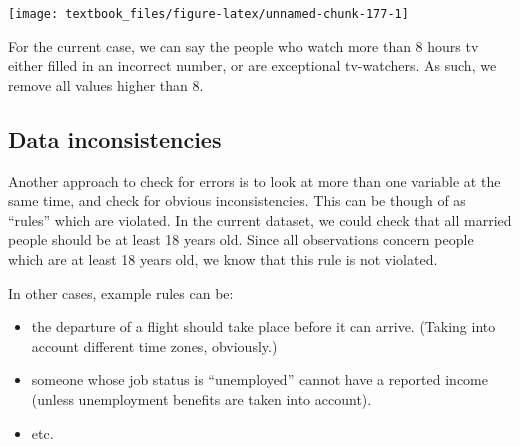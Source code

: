 \documentclass[]{tufte-book}
\newenvironment{Shaded}{}{}
\newcommand{\DataTypeTok}[1]{\textcolor[rgb]{0.56,0.13,0.00}{#1}}
\newcommand{\DecValTok}[1]{\textcolor[rgb]{0.25,0.63,0.44}{#1}}
\newcommand{\KeywordTok}[1]{\textcolor[rgb]{0.00,0.44,0.13}{\textbf{#1}}}
\newcommand{\NormalTok}[1]{#1}
\newcommand{\OperatorTok}[1]{\textcolor[rgb]{0.40,0.40,0.40}{#1}}
\newcommand{\OtherTok}[1]{\textcolor[rgb]{0.00,0.44,0.13}{#1}}
\newcommand{\StringTok}[1]{\textcolor[rgb]{0.25,0.44,0.63}{#1}}
\providecommand{\tightlist}{%
  \setlength{\itemsep}{0pt}\setlength{\parskip}{0pt}}
\begin{document}
\begin{Shaded}
\end{Shaded}

\texttt{[image: textbook\_files/figure-latex/unnamed-chunk-177-1]}

For the current case, we can say the people who watch more than 8 hours tv either filled in an incorrect number, or are exceptional tv-watchers. As such, we remove all values higher than 8.

\begin{Shaded}
\end{Shaded}

\hypertarget{data-inconsistencies}{%
\subsection{Data inconsistencies}\label{data-inconsistencies}}

Another approach to check for errors is to look at more than one variable at the same time, and check for obvious inconsistencies. This can be though of as ``rules'' which are violated. In the current dataset, we could check that all married people should be at least 18 years old. Since all observations concern people which are at least 18 years old, we know that this rule is not violated.

In other cases, example rules can be:

\begin{itemize}
\tightlist
\item
  the departure of a flight should take place before it can arrive. (Taking into account different time zones, obviously.)
\item
  someone whose job status is ``unemployed'' cannot have a reported income (unless unemployment benefits are taken into account).
\item
  etc.
\end{itemize}
\end{document}
